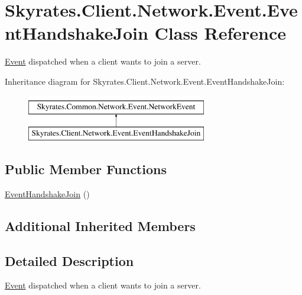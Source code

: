 \hypertarget{class_skyrates_1_1_client_1_1_network_1_1_event_1_1_event_handshake_join}{\section{Skyrates.\-Client.\-Network.\-Event.\-Event\-Handshake\-Join Class Reference}
\label{class_skyrates_1_1_client_1_1_network_1_1_event_1_1_event_handshake_join}
}


\hyperlink{namespace_skyrates_1_1_client_1_1_network_1_1_event}{Event} dispatched when a client wants to join a server.  


Inheritance diagram for Skyrates.\-Client.\-Network.\-Event.\-Event\-Handshake\-Join\-:\begin{figure}[H]
\begin{center}
\leavevmode
\includegraphics[height=2.000000cm]{class_skyrates_1_1_client_1_1_network_1_1_event_1_1_event_handshake_join}
\end{center}
\end{figure}
\subsection*{Public Member Functions}
\begin{DoxyCompactItemize}
\item 
\hyperlink{class_skyrates_1_1_client_1_1_network_1_1_event_1_1_event_handshake_join_a4080b2617fd7f4db4fce49e9e4655026}{Event\-Handshake\-Join} ()
\end{DoxyCompactItemize}
\subsection*{Additional Inherited Members}


\subsection{Detailed Description}
\hyperlink{namespace_skyrates_1_1_client_1_1_network_1_1_event}{Event} dispatched when a client wants to join a server. 



